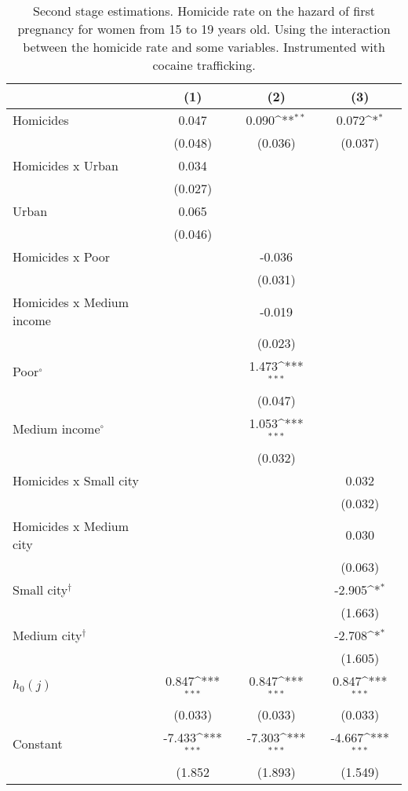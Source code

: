 \documentclass[a4paper,10pt,twocolumn,preprint,3p,authoryear]{elsarticle}
\def\sym#1{\ifmmode^{#1}\else\(^{#1}\)\fi}
\begin{document}
\begin{appendix}
\begin{table}[h]
	 \centering
	\caption{\\ Second stage estimations. Homicide rate on the hazard of first pregnancy for women from 15 to 19 years old. Using the interaction between the homicide rate and some variables. Instrumented with cocaine trafficking.}
	\footnotesize
	\centering
	\begin{tabular}{lccc}
		\hline
		&	(1)	&	(2)	&	(3) \\ 
			\hline
Homicides	&	0.047	&	0.090\sym{**}	&	       0.072\sym{*}  \\
&	(0.048)	&	(0.036)	&	     (0.037)         \\ 
\hline
Homicides x Urban	&	0.034	&		&	\\
&	(0.027)	&		&	\\
Urban	&	0.065	&		&	\\
&	(0.046)	&		&	\\ 
\hline
Homicides x Poor&		&	-0.036	&	\\
&		&	(0.031)	&	\\
Homicides x Medium income	&		&	-0.019	&	\\
&		&	(0.023)	&	\\
Poor$^{\circ}$ &		&	1.473\sym{***}	&	\\
&		&	(0.047)	&	\\
Medium income$^{\circ}$ 	&		&	1.053\sym{***}	&	\\ 
&		&	(0.032)	&	\\ \hline
Homicides x Small city	&		&		&	       0.032         \\
            	&		&		&	     (0.032)         \\
Homicides x Medium  city&		&		&	       0.030         \\
            	&		&		&	     (0.063)         \\
Small city$^{\dagger}$    	&		&		&	      -2.905\sym{*}  \\
            	&		&		&	     (1.663)         \\
Medium  city$^{\dagger}$     &		&		&	      -2.708\sym{*}  \\ 
	&		&		&	     (1.605)         \\ \hline
	$h_{0}\left( j \right)$	&	0.847\sym{***}	&	0.847\sym{***}	&	       0.847\sym{***}\\
	&	(0.033)	&	(0.033)	&	     (0.033)         \\
Constant	&	-7.433\sym{***}	&	-7.303\sym{***}	&	      -4.667\sym{***}\\
&	(1.852	&	(1.893)	&	     (1.549)         \\ \hline

\end{tabular}
\end{table}
\end{appendix}
\end{document}
